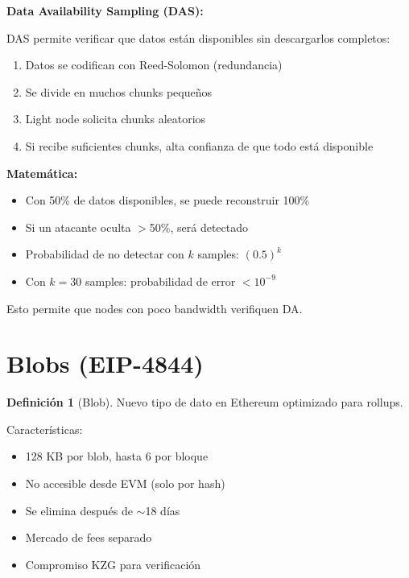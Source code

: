 \documentclass[11pt,a4paper,twoside,openright]{book}
\theoremstyle{definition}
\newtheorem{definition}{Definición}[chapter]
\theoremstyle{plain}
\theoremstyle{remark}
\begin{document}
\begin{mathnote}
\textbf{Data Availability Sampling (DAS):}

DAS permite verificar que datos están disponibles sin descargarlos completos:

\begin{enumerate}
    \item Datos se codifican con Reed-Solomon (redundancia)
    \item Se divide en muchos chunks pequeños
    \item Light node solicita chunks aleatorios
    \item Si recibe suficientes chunks, alta confianza de que todo está disponible
\end{enumerate}

\textbf{Matemática:}
\begin{itemize}
    \item Con 50\% de datos disponibles, se puede reconstruir 100\%
    \item Si un atacante oculta $>$50\%, será detectado
    \item Probabilidad de no detectar con $k$ samples: $(0.5)^k$
    \item Con $k = 30$ samples: probabilidad de error $< 10^{-9}$
\end{itemize}

Esto permite que nodes con poco bandwidth verifiquen DA.
\end{mathnote}

\section{Blobs (EIP-4844)}

\begin{definition}[Blob]
Nuevo tipo de dato en Ethereum optimizado para rollups.
\end{definition}

Características:
\begin{itemize}
    \item 128 KB por blob, hasta 6 por bloque
    \item No accesible desde EVM (solo por hash)
    \item Se elimina después de $\sim$18 días
    \item Mercado de fees separado
    \item Compromiso KZG para verificación
\end{itemize}
\end{document}
